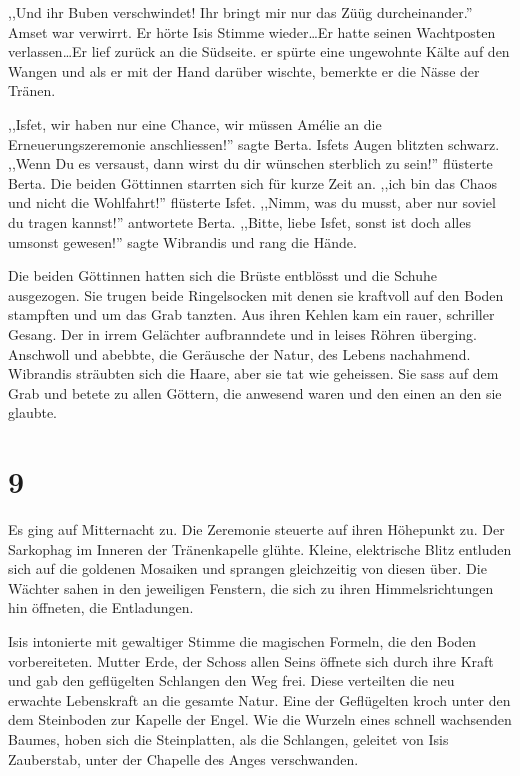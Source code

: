 ,,Und ihr Buben verschwindet! Ihr bringt mir nur das Züüg durcheinander.'' Amset war verwirrt. Er hörte Isis Stimme wieder\dots Er hatte seinen Wachtposten verlassen\dots Er lief zurück an die Südseite. er spürte eine ungewohnte Kälte auf den Wangen und als er mit der Hand darüber wischte, bemerkte er die Nässe der Tränen. 

,,Isfet, wir haben nur eine Chance, wir müssen Amélie an die Erneuerungszeremonie anschliessen!'' sagte Berta. Isfets Augen blitzten schwarz. ,,Wenn Du es versaust, dann wirst du dir wünschen sterblich zu sein!'' flüsterte Berta. Die beiden Göttinnen starrten sich für kurze Zeit an. ,,ich bin das Chaos und nicht die Wohlfahrt!'' flüsterte Isfet. ,,Nimm, was du musst, aber nur soviel du tragen kannst!'' antwortete Berta. ,,Bitte, liebe Isfet, sonst ist doch alles umsonst gewesen!'' sagte Wibrandis und rang die Hände.

Die beiden Göttinnen hatten sich die Brüste entblösst und die Schuhe ausgezogen. Sie trugen beide Ringelsocken mit denen sie kraftvoll auf den Boden stampften und um das Grab tanzten. Aus ihren Kehlen kam ein rauer, schriller Gesang. Der in irrem Gelächter aufbranndete und in leises Röhren überging. Anschwoll und abebbte, die Geräusche der Natur, des Lebens nachahmend. Wibrandis sträubten sich die Haare, aber sie tat wie geheissen. Sie sass auf dem Grab und betete zu allen Göttern, die anwesend waren und den einen an den sie glaubte.

\section*{9}

Es ging auf Mitternacht zu. Die Zeremonie steuerte auf ihren Höhepunkt zu. Der Sarkophag im Inneren der Tränenkapelle glühte. Kleine, elektrische Blitz entluden sich auf die goldenen Mosaiken und sprangen gleichzeitig von diesen über. Die Wächter sahen in den jeweiligen Fenstern, die sich zu ihren Himmelsrichtungen hin öffneten, die Entladungen.

Isis intonierte mit gewaltiger Stimme die magischen Formeln, die den Boden vorbereiteten. Mutter Erde, der Schoss allen Seins öffnete sich durch ihre Kraft und gab den geflügelten Schlangen den Weg frei. Diese verteilten die neu erwachte Lebenskraft an die gesamte Natur. Eine der Geflügelten kroch unter den dem Steinboden zur Kapelle der Engel. Wie die Wurzeln eines schnell wachsenden Baumes, hoben sich die Steinplatten, als die Schlangen, geleitet von Isis Zauberstab, unter der Chapelle des Anges verschwanden.

